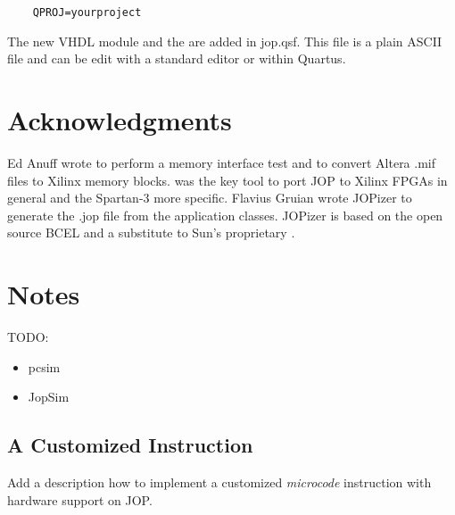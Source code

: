 \begin{verbatim}
    QPROJ=yourproject
\end{verbatim}

The new VHDL module and the  are added in
jop.qsf. This file is a plain ASCII file and can be edit with a
standard editor or within Quartus.



\section{Acknowledgments}

Ed Anuff wrote  to perform a memory interface test
and  to convert Altera .mif files to Xilinx
memory blocks.  was the key tool to port JOP to
Xilinx FPGAs in general and the Spartan-3 more specific. Flavius
Gruian wrote JOPizer to generate the .jop file from the application
classes. JOPizer is based on the open source BCEL and a substitute
to Sun's proprietary .

\section{Notes}

TODO:

\begin{itemize}
    \item pcsim
    \item JopSim
\end{itemize}


\subsection{A Customized Instruction}

Add a description how to implement a customized \emph{microcode}
instruction with hardware support on JOP.

